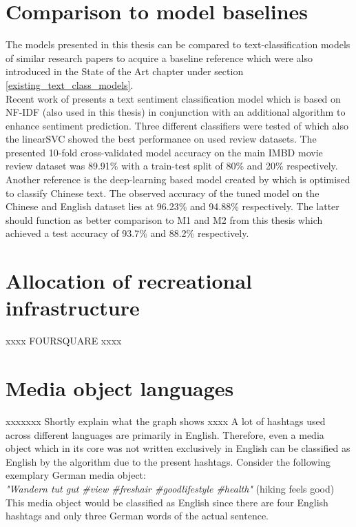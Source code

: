 \section{Comparison to model baselines} \label{model_baseline}
The models presented in this thesis can be compared to text-classification models of similar research papers to acquire a baseline reference which were also introduced in the State of the Art chapter under section \ref{existing_text_class_models}. \\
Recent work of \textcite{Das2018} presents a text sentiment classification model which is based on NF-IDF (also used in this thesis) in conjunction with an additional algorithm to enhance sentiment prediction. Three different classifiers were tested of which also the linearSVC showed the best performance on used review datasets. The presented 10-fold cross-validated model accuracy on the main IMBD movie review dataset was 89.91\% with a train-test split of 80\% and 20\% respectively.\\
Another reference is the deep-learning based model created by \textcite{Li2018} which is optimised to classify Chinese text. The observed accuracy of the tuned model on the Chinese and English dataset lies at 96.23\% and 94.88\% respectively. The latter should function as better comparison to M1 and M2 from this thesis which achieved a test accuracy of 93.7\% and 88.2\% respectively.

\section{Allocation of recreational infrastructure} \label{discussion_foursquare}
xxxx FOURSQUARE xxxx

\section{Media object languages}
xxxxxxx Shortly explain what the graph shows xxxx
A lot of hashtags used across different languages are primarily in English. Therefore, even a media object which in its core was not written exclusively in English can be classified as English by the algorithm due to the present hashtags. Consider the following exemplary German media object: \\ \textit{"Wandern tut gut \#view \#freshair \#goodlifestyle \#health"} (hiking feels good) \\ This media object would be classified as English since there are four English hashtags and only three German words of the actual sentence.

